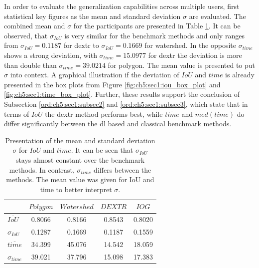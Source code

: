 In order to evaluate the generalization capabilities across multiple users, first statistical key figures as the mean and standard deviation $ \sigma $ are evaluated.
The combined mean and $ \sigma $ for the participants are presented in Table \ref{tab:ch5:all_benchmark_users_varaince}.
It can be observed, that $ \sigma_{IoU} $ is very similar for the benchmark methods and only ranges from $ \sigma_{IoU} = 0.1187 $ for \gls{dextr} to $ \sigma_{IoU} = 0.1669 $ for watershed.
In the opposite $ \sigma_{time} $ shows a strong deviation, with $ \sigma_{time} = 15.0977 $ for \gls{dextr} the deviation is more than double than $ \sigma_{time} = 39.0214 $ for polygon.
The mean value is presented to put $ \sigma $ into context.
A graphical illustration if the deviation of $ IoU $ and $ time $ is already presented in the box plots from Figure \ref{fig:ch5:sec1:iou_box_plot} and \ref{fig:ch5:sec1:time_box_plot}.
Further, these results support the conclusion of Subsection \ref{ord:ch5:sec1:subsec2} and \ref{ord:ch5:sec1:subsec3}, which state that in terms of $ IoU $ the \gls{dextr} method performs best, while $ \overline{time} $ and $ med(time) $ do differ significantly between the \gls{dl} based and classical benchmark methods.
\begin{table}[h!]
	\centering
	\begin{tabular}{l|c c c c}
		\toprule 		
			 				& $ Polygon $  	& $ Watershed $ 	& $ DEXTR $ 	& $ IOG $	\\
		\midrule
		$ \overline{IoU} $	& 0.8066 		& 0.8166		 	& 0.8543		& 0.8020	\\
		$ \sigma_{IoU} $	& 0.1287 		& 0.1669		 	& 0.1187 		& 0.1559	\\
		$ \overline{time} $	& 34.399 		& 45.076			& 14.542 		& 18.059	\\
		$ \sigma_{time} $	& 39.021 		& 37.796			& 15.098 		& 17.383	\\
		\bottomrule
	\end{tabular}
	\caption[Mean and standard deviation of the benchmark methods]{
		Presentation of the mean and standard deviation $ \sigma $ for $ IoU $ and $ time $.
		It can be seen that $ \sigma_{IoU} $ stays almost constant over the benchmark methods.
		In contrast, $ \sigma_{time} $ differs between the methods.
		The mean value was given for IoU and time to better interpret $ \sigma $.
	}\label{tab:ch5:all_benchmark_users_varaince}	
\end{table}


